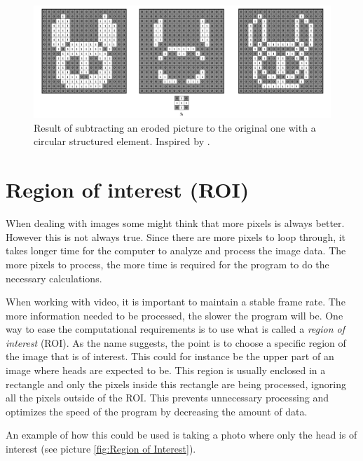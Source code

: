\begin{figure}[htbp]
\centering
\includegraphics[width=1\textwidth]{Pictures/Theory/BoundaryEdges_circ.png}
\caption{Result of subtracting an eroded picture to the original one with a circular structured element. Inspired by \citep{ip_book}.}
\label{fig:Boundary}
\end{figure}

\section{Region of interest (ROI)}\label{roi}
When dealing with images some might think that more pixels is always better. However this is not always true. Since there are more pixels to loop through, it takes longer time for the computer to analyze and process the image data. The more pixels to process, the more time is required for the program to do the necessary calculations.

When working with video, it is important to maintain a stable frame rate. The more information needed to be processed, the slower the program will be. One way to ease the computational requirements is to use what is called a \textit{region of interest} (ROI). As the name suggests, the point is to choose a specific region of the image that is of interest. This could for instance be the upper part of an image where heads are expected to be. This region is usually enclosed in a rectangle and only the pixels inside this rectangle are being processed, ignoring all the pixels outside of the ROI. This prevents unnecessary processing and optimizes the speed of the program by decreasing the amount of data.

An example of how this could be used is taking a photo where only the head is of interest (see picture \ref{fig:Region of Interest}).


